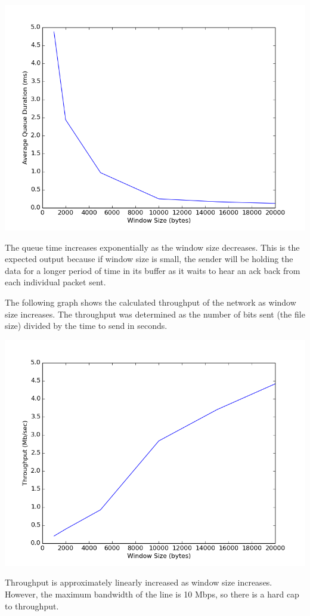 \documentclass[11pt]{article}
\begin{document}
\includegraphics[width=17cm]{outputs/lab2_queue.png}

The queue time increases exponentially as the window size decreases. This is the expected output because if window size is small, the sender will be holding the data for a longer period of time in its buffer as it waits to hear an ack back from each individual packet sent.

The following graph shows the calculated throughput of the network as window size increases. The throughput was determined as the number of bits sent (the file size) divided by the time to send in seconds.

\includegraphics[width=17cm]{outputs/lab2_throughput.png}

Throughput is approximately linearly increased as window size increases. However, the maximum bandwidth of the line is 10 Mbps, so there is a hard cap to throughput.
\end{document}
